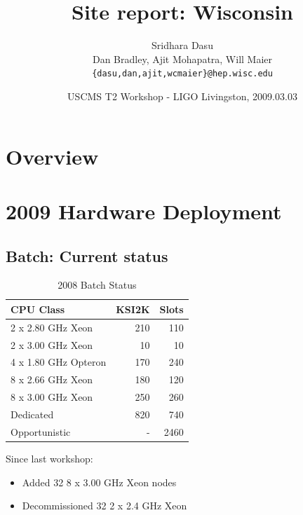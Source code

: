 \documentclass{beamer}
\title{Site report: Wisconsin}
\author[Maier]{
    Sridhara Dasu \\
    Dan Bradley, Ajit Mohapatra, Will Maier
    {\tt \{dasu,dan,ajit,wcmaier\}@hep.wisc.edu}}
\institute[Wisconsin]{University of Wisconsin - High Energy Physics}
\date[2009.03.03]{USCMS T2 Workshop - LIGO Livingston, 2009.03.03}
\begin{document}

\begin{frame}
    \titlepage
\end{frame}

\section{Overview}
\begin{frame}
    \tableofcontents
\end{frame}

\section{2009 Hardware Deployment}
\subsection{Batch: Current status}
\begin{frame}
\begin{table}
\begin{tabular}{lrr}
    \toprule
    CPU Class               &   KSI2K   &   Slots \\
    \midrule
    2 x 2.80 GHz Xeon       &   210     &   110 \\  %
    2 x 3.00 GHz Xeon       &   10      &   10 \\   %
    4 x 1.80 GHz Opteron    &   170     &   240 \\  %
    8 x 2.66 GHz Xeon       &   180     &   120 \\  %
    8 x 3.00 GHz Xeon       &   250     &   260 \\  %
    \midrule
    Dedicated               &   820     &   740 \\
    Opportunistic           &   -       &   2460 \\
    \bottomrule
\end{tabular}
\caption{2008 Batch Status}
\label{2008_batch_status}
\end{table}

Since last workshop:
\begin{itemize}
    \item Added 32 8 x 3.00 GHz Xeon nodes
    \item Decommissioned 32 2 x 2.4 GHz Xeon
\end{itemize}
\end{frame}
\end{document}
